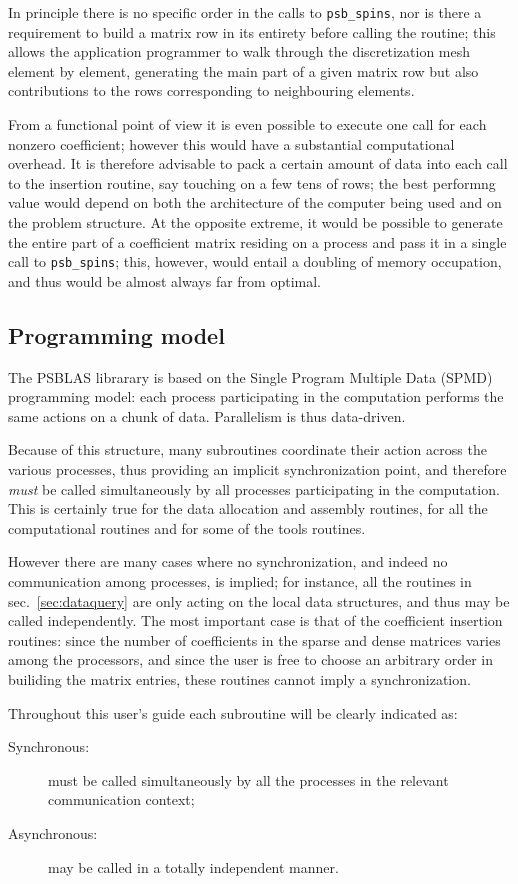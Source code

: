 In principle there is no specific order in the calls to
\verb|psb_spins|, nor is there a requirement to build a matrix row in
its entirety before calling the routine; this allows the application
programmer to walk through the discretization mesh element by element,
generating the main part of a given matrix row but also contributions
to the rows corresponding to neighbouring elements. 

From a functional point of view it is even possible to execute one
call for each nonzero coefficient; however this would have a
substantial computational overhead. It is therefore advisable to pack
a certain amount of data into each call to the insertion routine, say
touching on a few tens of rows; the best performng value would depend
on both the architecture of the computer being used and on the problem
structure. 
At the opposite extreme, it would be possible to generate the entire
part of a coefficient matrix residing on a process and pass it in a
single call to \verb|psb_spins|; this, however, would entail a
doubling of memory occupation, and thus would be almost always far
from optimal. 

\subsection{Programming model}

The PSBLAS librarary is based on the Single Program Multiple Data
(SPMD) programming model: each process participating in the
computation performs the same actions on a chunk of data. Parallelism
is thus data-driven. 

Because of this structure, many subroutines coordinate their action
across the various processes, thus providing an implicit
synchronization point, and therefore \emph{must} be
called simultaneously by all processes participating in the
computation. This is certainly true for the data allocation and
assembly routines, for  all the computational routines and for some of
the tools routines.

However there are many cases where no synchronization, and indeed no
communication among processes, is implied; for instance, all the routines in
sec.~\ref{sec:dataquery} are only acting on the local data structures,
and thus may be called independently. The most important case is that
of the coefficient insertion routines: since the number of
coefficients in the sparse and dense matrices varies among the
processors, and since the user is free to choose an arbitrary order in
builiding the matrix entries, these routines cannot imply a
synchronization. 

Throughout this user's guide each subroutine will be clearly indicated
as:
\begin{description}
\item[Synchronous:] must be called simultaneously by all the
  processes in the relevant communication context;
\item[Asynchronous:] may be called in a totally independent manner.
\end{description}

